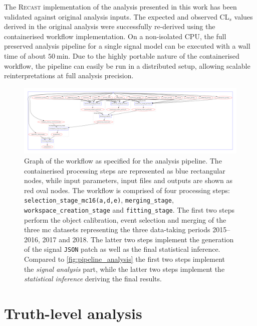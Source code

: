 The \textsc{Recast} implementation of the analysis presented in this work has been validated against original analysis inputs. The expected and observed CL$_s$ values derived in the original analysis were successfully re-derived using the containerised workflow implementation. On a non-isolated CPU, the full preserved analysis pipeline for a single signal model can be executed with a wall time of about $\SI{50}{\minute}$. Due to the highly portable nature of the containerised workflow, the pipeline can easily be run in a distributed setup, allowing scalable reinterpretations at full analysis precision. 


 \begin{figure}
	\centering\includegraphics[width=\textwidth]{yadage_workflow_instance}
	\caption{Graph of the workflow as specified for the analysis pipeline. The containerised processing steps are represented as blue rectangular nodes, while input parameters, input files and outputs are shown as red oval nodes. The workflow is comprised of four processing steps: \texttt{selection\_stage\_mc16(a,d,e)}, \texttt{merging\_stage}, \texttt{workspace\_creation\_stage} and \texttt{fitting\_stage}. The first two steps perform the object calibration, event selection and merging of the three \gls{mc} datasets representing the three data-taking periods 2015--2016, 2017 and 2018. The latter two steps implement the generation of the signal \texttt{JSON} patch as well as the final statistical inference. Compared to \cref{fig:pipeline_analysis} the first two steps implement the \textit{signal analysis} part, while the latter two steps implement the \textit{statistical inference} deriving the final results.} 
	\label{fig:recast_workflow}
\end{figure}


\FloatBarrier

\section{Truth-level analysis}\label{sec:truth_analysis}

\ifpdf
    \graphicspath{{chapter-pmssm/Figs/Raster/}{chapter-pmssm/Figs/PDF/}{chapter-pmssm/Figs/}}
\else
    \graphicspath{{chapter-pmssm/Figs/Vector/}{chapter-pmssm/Figs/}}
\fi


